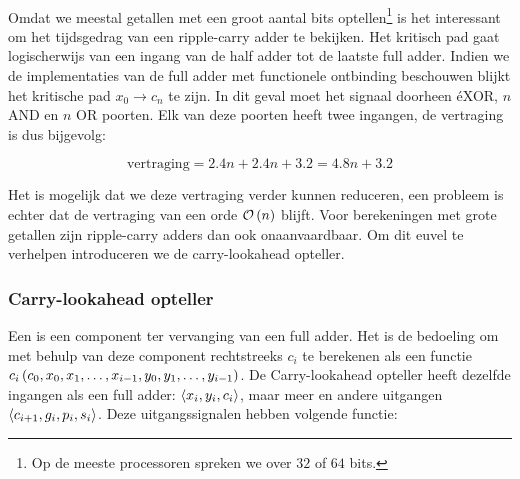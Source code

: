\paragraph{}
Omdat we meestal getallen met een groot aantal bits optellen\footnote{Op de meeste processoren spreken we over $32$ of $64$ bits.} is het interessant om het tijdsgedrag van een ripple-carry adder te bekijken. Het kritisch pad gaat logischerwijs van een ingang van de half adder tot de laatste full adder. Indien we de implementaties van de full adder met functionele ontbinding beschouwen blijkt het kritische pad $x_0\rightarrow c_n$ te zijn. In dit geval moet het signaal doorheen \'e\en XOR, $n$ AND en $n$ OR poorten. Elk van deze poorten heeft twee ingangen, de vertraging is dus bijgevolg:

\begin{equation}
\mbox{vertraging}=2.4n+2.4n+3.2=4.8n+3.2
\end{equation}

Het is mogelijk dat we deze vertraging verder kunnen reduceren, een probleem is echter dat de vertraging van een orde $\mathcal{O}\left( n \right)$ blijft. Voor berekeningen met grote getallen zijn ripple-carry adders dan ook onaanvaardbaar. Om dit euvel te verhelpen introduceren we de carry-lookahead opteller.

\subsubsection{Carry-lookahead opteller}
Een  is een component ter vervanging van een full adder. Het is de bedoeling om met behulp van deze component rechtstreeks $c_i$ te berekenen als een functie $c_i\left( c_0,x_0,x_1,\ldots,x_{i-1},y_0,y_1,\ldots,y_{i-1} \right)$. De Carry-lookahead opteller heeft dezelfde ingangen als een full adder: $\left\langle x_i,y_i,c_i \right\rangle$, maar meer en andere uitgangen $\left\langle c_{i+1},g_i,p_i,s_i \right\rangle$. Deze uitgangssignalen hebben volgende functie:

